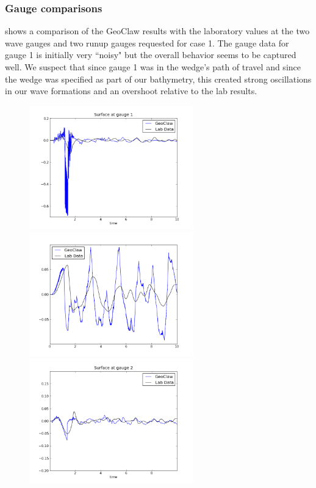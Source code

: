 \subsubsection{Gauge comparisons}

 shows a comparison of the GeoClaw results with the
laboratory values at the two wave gauges and two runup gauges requested
for case 1.  The gauge data for gauge 1 is initially very ``noisy" but the overall
behavior seems to be captured well.  We suspect that since gauge 1 was in
the wedge's path of travel and since the wedge was specified as part of our
bathymetry, this created strong oscillations in our wave formations
and an overshoot relative to the lab results.  

\begin{figure}[ht]
\hfil\includegraphics[width=2.8in]{bp12/case1wavegauge1.png}\hfil
\hfil\includegraphics[width=2.8in]{bp12/case1runupgauge2.png}\hfil
\vskip 5pt
\hfil\includegraphics[width=2.8in]{bp12/case1wavegauge2.png}\hfil

\end{figure}
